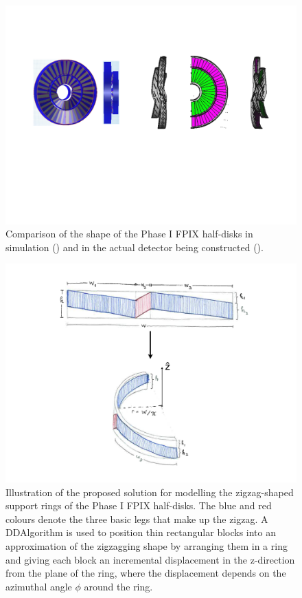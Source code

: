 \begin{figure}[hbtp]
  \begin{center}
    \includegraphics[width=2.0\cmsFigWidth]{figures/phaseI_diskcomparison}
    \caption{Comparison of the shape of the Phase I FPIX half-disks in simulation (\cmsLeft) and in the actual detector being constructed (\cmsRight).}
    \label{fig:phaseI_diskcomparison}
  \end{center}
\end{figure}

\begin{figure}[hbtp]
  \begin{center}
    \includegraphics[width=2.0\cmsFigWidth]{figures/phaseI_disksolution}
    \caption{Illustration of the proposed solution for modelling the zigzag-shaped support rings of the Phase I FPIX half-disks. The blue and red colours denote the three basic legs that make up the zigzag. A DDAlgorithm is used to position thin rectangular blocks into an approximation of the zigzagging shape by arranging them in a ring and giving each block an incremental displacement in the z-direction from the plane of the ring, where the displacement depends on the azimuthal angle $\phi$ around the ring.}
    \label{fig:phaseI_disksolution}
  \end{center}
\end{figure}

